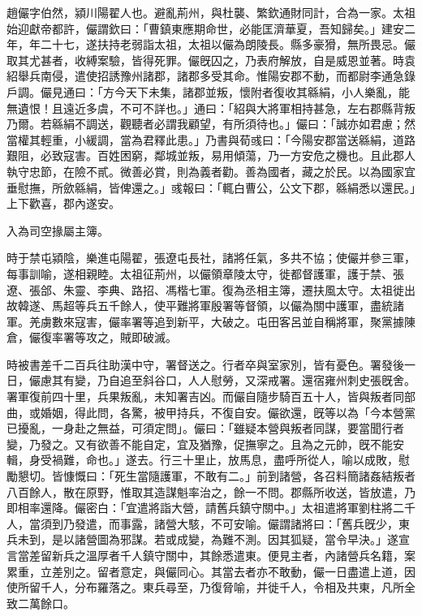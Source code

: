 \begin{pinyinscope}
 
 
 趙儼字伯然，潁川陽翟人也。避亂荊州，與杜襲、繁欽通財同計，合為一家。太祖始迎獻帝都許，儼謂欽曰：「曹鎮東應期命世，必能匡濟華夏，吾知歸矣。」建安二年，年二十七，遂扶持老弱詣太祖，太祖以儼為朗陵長。縣多豪猾，無所畏忌。儼取其尤甚者，收縛案驗，皆得死罪。儼旣囚之，乃表府解放，自是威恩並著。時袁紹舉兵南侵，遣使招誘豫州諸郡，諸郡多受其命。惟陽安郡不動，而都尉李通急錄戶調。儼見通曰：「方今天下未集，諸郡並叛，懷附者復收其緜絹，小人樂亂，能無遺恨！且遠近多虞，不可不詳也。」通曰：「紹與大將軍相持甚急，左右郡縣背叛乃爾。若緜絹不調送，觀聽者必謂我顧望，有所須待也。」儼曰：「誠亦如君慮；然當權其輕重，小緩調，當為君釋此患。」乃書與荀彧曰：「今陽安郡當送緜絹，道路艱阻，必致寇害。百姓困窮，鄰城並叛，易用傾蕩，乃一方安危之機也。且此郡人執守忠節，在險不貳。微善必賞，則為義者勸。善為國者，藏之於民。以為國家宜垂慰撫，所歛緜絹，皆俾還之。」彧報曰：「輒白曹公，公文下郡，緜絹悉以還民。」上下歡喜，郡內遂安。
 
 
 
 
 入為司空掾屬主簿。
 
 
 時于禁屯潁陰，樂進屯陽翟，張遼屯長社，諸將任氣，多共不協；使儼并參三軍，每事訓喻，遂相親睦。太祖征荊州，以儼領章陵太守，徙都督護軍，護于禁、張遼、張郃、朱靈、李典、路招、馮楷七軍。復為丞相主簿，遷扶風太守。太祖徙出故韓遂、馬超等兵五千餘人，使平難將軍殷署等督領，以儼為關中護軍，盡統諸軍。羌虜數來寇害，儼率署等追到新平，大破之。屯田客呂並自稱將軍，聚黨據陳倉，儼復率署等攻之，賊即破滅。
 
 
時被書差千二百兵往助漢中守，署督送之。行者卒與室家別，皆有憂色。署發後一日，儼慮其有變，乃自追至斜谷口，人人慰勞，又深戒署。還宿雍州刺史張旣舍。署軍復前四十里，兵果叛亂，未知署吉凶。而儼自隨步騎百五十人，皆與叛者同部曲，或婚姻，得此問，各驚，被甲持兵，不復自安。儼欲還，旣等以為「今本營黨已擾亂，一身赴之無益，可須定問」。儼曰：「雖疑本營與叛者同謀，要當聞行者變，乃發之。又有欲善不能自定，宜及猶豫，促撫寧之。且為之元帥，旣不能安輯，身受禍難，命也。」遂去。行三十里止，放馬息，盡呼所從人，喻以成敗，慰勵懇切。皆慷慨曰：「死生當隨護軍，不敢有二。」前到諸營，各召料簡諸姦結叛者八百餘人，散在原野，惟取其造謀魁率治之，餘一不問。郡縣所收送，皆放遣，乃即相率還降。儼密白：「宜遣將詣大營，請舊兵鎮守關中。」太祖遣將軍劉柱將二千人，當須到乃發遣，而事露，諸營大駭，不可安喻。儼謂諸將曰：「舊兵旣少，東兵未到，是以諸營圖為邪謀。若或成變，為難不測。因其狐疑，當令早決。」遂宣言當差留新兵之溫厚者千人鎮守關中，其餘悉遣東。便見主者，內諸營兵名籍，案累重，立差別之。留者意定，與儼同心。其當去者亦不敢動，儼一日盡遣上道，因使所留千人，分布羅落之。東兵尋至，乃復脅喻，并徙千人，令相及共東，凡所全致二萬餘口。
 

\end{pinyinscope}

